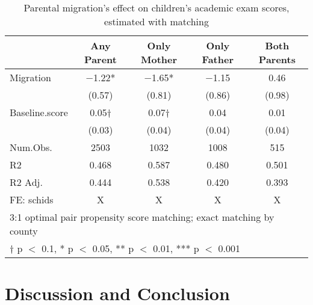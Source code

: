 \documentclass[
  man,floatsintext]{apa7}
\begin{document}
\newpage

\begin{table}

\caption{Parental migration’s effect on children’s academic exam scores, estimated with matching}
\centering
\begin{tabular}[t]{lcccc}
\toprule
  & Any Parent & Only Mother & Only Father & Both Parents\\
\midrule
Migration & \num{-1.22}* & \num{-1.65}* & \num{-1.15} & \num{0.46}\\
 & (\num{0.57}) & (\num{0.81}) & (\num{0.86}) & (\num{0.98})\\
Baseline.score & \num{0.05}† & \num{0.07}† & \num{0.04} & \num{0.01}\\
 & (\num{0.03}) & (\num{0.04}) & (\num{0.04}) & (\num{0.04})\\
\midrule
Num.Obs. & \num{2503} & \num{1032} & \num{1008} & \num{515}\\
R2 & \num{0.468} & \num{0.587} & \num{0.480} & \num{0.501}\\
R2 Adj. & \num{0.444} & \num{0.538} & \num{0.420} & \num{0.393}\\
FE: schids & X & X & X & X\\
\bottomrule
\multicolumn{5}{l}{\rule{0pt}{1em}3:1 optimal pair propensity score matching; exact matching by county}\\
\multicolumn{5}{l}{\rule{0pt}{1em}† p $<$ 0.1, * p $<$ 0.05, ** p $<$ 0.01, *** p $<$ 0.001}\\
\end{tabular}
\end{table}

\newpage

\hypertarget{discussion-and-conclusion}{%
\section{Discussion and Conclusion}\label{discussion-and-conclusion}}
\end{document}
